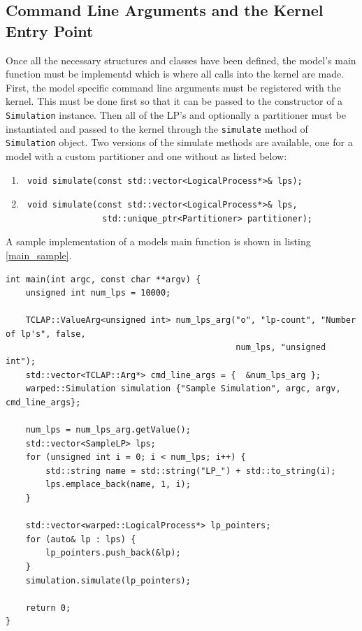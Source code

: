 \documentclass[11pt]{book}
\begin{document}
\subsection{Command Line Arguments and the Kernel Entry Point}

Once all the necessary structures and classes have been defined, the model's main function
must be implementd which is where all calls into the kernel are made. First, the model
specific command line arguments must be registered with the kernel. This must be done first
so that it can be passed to the constructor of a \texttt{Simulation} instance. Then all of
the LP's and optionally a partitioner must be instantiated and passed to the kernel through
the \texttt{simulate} method of \texttt{Simulation} object. Two versions of the simulate
methods are available, one for a model with a custom partitioner and one without as listed below:

\begin{enumerate}
    \item \begin{verbatim} void simulate(const std::vector<LogicalProcess*>& lps); \end{verbatim}
    \item \begin{verbatim} void simulate(const std::vector<LogicalProcess*>& lps,
                std::unique_ptr<Partitioner> partitioner); \end{verbatim}
\end{enumerate}

\noindent
A sample implementation of a models main function is shown in listing \ref{main_sample}.

\begin{lstlisting}[caption=Sample \textsc{warped2} Main Definition, label=main_sample, float]
int main(int argc, const char **argv) {
    unsigned int num_lps = 10000;

    TCLAP::ValueArg<unsigned int> num_lps_arg("o", "lp-count", "Number of lp's", false,
                                              num_lps, "unsigned int");
    std::vector<TCLAP::Arg*> cmd_line_args = {  &num_lps_arg };
    warped::Simulation simulation {"Sample Simulation", argc, argv, cmd_line_args};

    num_lps = num_lps_arg.getValue();
    std::vector<SampleLP> lps;
    for (unsigned int i = 0; i < num_lps; i++) {
        std::string name = std::string("LP_") + std::to_string(i);
        lps.emplace_back(name, 1, i);
    }

    std::vector<warped::LogicalProcess*> lp_pointers;
    for (auto& lp : lps) {
        lp_pointers.push_back(&lp);
    }
    simulation.simulate(lp_pointers);

    return 0;
}
\end{lstlisting}
\end{document}
